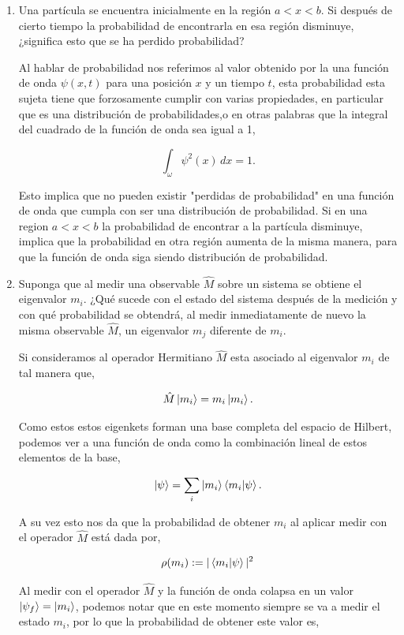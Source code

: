 \documentclass[12pt,a4paper]{article}
\begin{document}
\begin{enumerate}[label=\alph*)]
\item Una partícula se encuentra inicialmente en la región $ a<x<b $. Si después de cierto tiempo la probabilidad de encontrarla en esa región disminuye, ¿significa esto que se ha perdido probabilidad? 

Al hablar de probabilidad nos referimos al valor obtenido por la una función de onda $ \psi(x, t) $ para una posición $ x $ y un tiempo $ t $, esta probabilidad esta sujeta tiene que forzosamente cumplir con varias propiedades, en particular que es una distribución de probabilidades,o en otras palabras que la integral del cuadrado de la función de onda sea igual a 1,

\[
\int_{\omega} \psi^{2}(x)  \, dx = 1.
\]

Esto implica que no pueden existir "perdidas de probabilidad" en una función de onda que cumpla con ser una distribución de probabilidad.
Si en una region $ a<x<b $ la probabilidad de encontrar a la partícula disminuye, implica que la probabilidad en otra región aumenta de la misma manera, para que la función de onda siga siendo distribución de probabilidad.

\item Suponga que al medir una observable $ \hat{M} $ sobre un sistema se obtiene el eigenvalor $ m_{i}$. ¿Qué sucede con el estado del sistema después de la medición y con qué probabilidad se obtendrá, al medir inmediatamente de nuevo la misma observable $ \hat{M} $, un eigenvalor $ m_{j} $ diferente de $ m_{i} $.

Si consideramos al operador Hermitiano $ \hat{M} $ esta asociado al eigenvalor $ m_{i} $ de tal manera que,

\[
\hat{M} \ket{m_{i}} = m_{i}\ket{m_{i}}.
\]

Como estos estos eigenkets forman una base completa del espacio de Hilbert, podemos ver a una función de onda como la combinación lineal de estos elementos de la base,

\[
\ket{\psi} = \sum_{i} \ket{m_{i}} \braket{m_{i}|\psi}. 
\]

A su vez esto nos da que la probabilidad de obtener $ m_{i} $ al aplicar medir con el operador $ \hat{M} $ está dada por,

\[
\rho(m_{i}) := |\braket{m_{i}|\psi}|^{2}
\]

Al medir con el operador $ \hat{M} $ y la función de onda colapsa en un valor $ \ket{\psi_{f}} = \ket{m_{i}}$, podemos notar que en este momento siempre se va a medir el estado $ m_{i} $, por lo que la probabilidad de obtener este valor es,


\end{enumerate}
\end{document}
